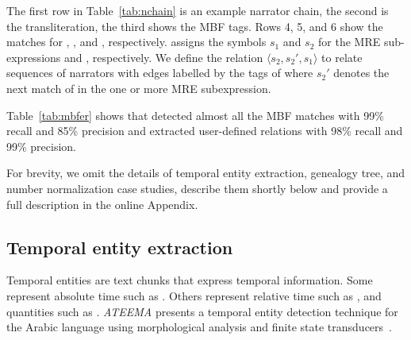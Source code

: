 The first row in Table~\ref{tab:nchain} is an example narrator chain,
the second is the transliteration, the third 
shows the MBF tags. Rows 4, 5, and 6 show the 
matches for , , and ,
respectively.
%
\framework assigns the symbols $s_1$ and $s_2$ for the 
MRE sub-expressions  and , respectively. 
We define the relation $\langle s_2,s_2',s_1\rangle$ 
to relate sequences of narrators with edges labelled by the tags of  where 
$s_2'$ denotes the next match of  in the one or more MRE subexpression.

Table~\ref{tab:mbfer} shows that \framework detected almost all the MBF matches 
with 99\% recall and 85\% precision and 
extracted user-defined relations with 98\% recall and 99\% precision.

For brevity, we omit the details of \framework temporal entity extraction, 
genealogy tree, and number normalization case studies, describe them shortly
below and provide a full description in the online Appendix.

\vspace{-1em}
\subsection{Temporal entity extraction}

Temporal entities are text chunks that express temporal information. 
Some represent absolute time such as . 
Others represent relative time such as , and quantities 
such as . 
{\em ATEEMA} presents a temporal entity detection technique for the Arabic language using 
morphological analysis and finite state transducers~\cite{ZaMa2012IJCLATime}. 


